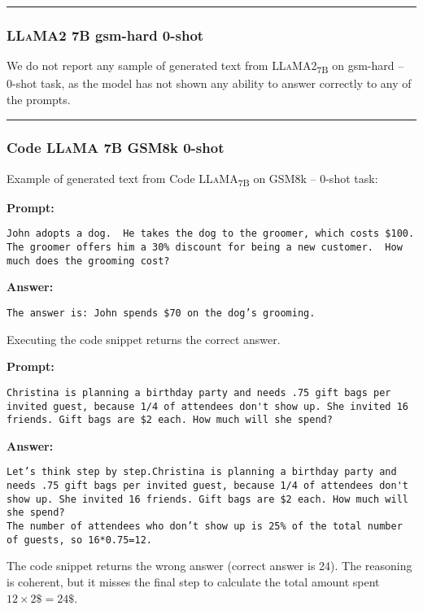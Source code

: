 \noindent\rule{\textwidth}{0.4pt}

\subsubsection*{\textsc{LLaMA}2 7B gsm-hard 0-shot}
We do not report any sample of generated text from \textsc{LLaMA}2\textsubscript{7B} on gsm-hard -- 0-shot task, as the model has not shown any ability to answer correctly to any of the prompts.

\noindent\rule{\textwidth}{0.4pt}

\subsubsection*{Code \textsc{LLaMA} 7B GSM8k 0-shot}
\noindent Example of generated text from Code \textsc{LLaMA}\textsubscript{7B} on GSM8k -- 0-shot task:
\begin{displayquote}
	\textbf{Prompt:}
	\begin{Verbatim}[fontsize=\small,breaklines]
John adopts a dog.  He takes the dog to the groomer, which costs $100.  The groomer offers him a 30% discount for being a new customer.  How much does the grooming cost?
    \end{Verbatim}
	\textbf{Answer:}
	\begin{Verbatim}[fontsize=\small,breaklines]
The answer is: John spends $70 on the dog’s grooming.
    \end{Verbatim}
\end{displayquote}
Executing the code snippet returns the correct answer.
\begin{displayquote}
	\textbf{Prompt:}
	\begin{Verbatim}[fontsize=\small,breaklines]
Christina is planning a birthday party and needs .75 gift bags per invited guest, because 1/4 of attendees don't show up. She invited 16 friends. Gift bags are $2 each. How much will she spend?
    \end{Verbatim}
	\textbf{Answer:}
	\begin{Verbatim}[fontsize=\small,breaklines]
Let’s think step by step.Christina is planning a birthday party and needs .75 gift bags per invited guest, because 1/4 of attendees don't show up. She invited 16 friends. Gift bags are $2 each. How much will she spend?
The number of attendees who don’t show up is 25% of the total number of guests, so 16*0.75=12.
    \end{Verbatim}
\end{displayquote}
The code snippet returns the wrong answer (correct answer is 24).
The reasoning is coherent, but it misses the final step to calculate the total amount spent $12 \times 2\$ = 24\$$.

